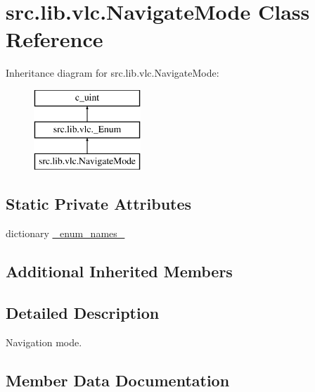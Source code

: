 \hypertarget{classsrc_1_1lib_1_1vlc_1_1NavigateMode}{}\section{src.\+lib.\+vlc.\+Navigate\+Mode Class Reference}
\label{classsrc_1_1lib_1_1vlc_1_1NavigateMode}
Inheritance diagram for src.\+lib.\+vlc.\+Navigate\+Mode\+:\begin{figure}[H]
\begin{center}
\leavevmode
\includegraphics[height=3.000000cm]{classsrc_1_1lib_1_1vlc_1_1NavigateMode}
\end{center}
\end{figure}
\subsection*{Static Private Attributes}
\begin{DoxyCompactItemize}
\item 
dictionary \hyperlink{classsrc_1_1lib_1_1vlc_1_1NavigateMode_a6bd87d39ccd020c4b4a2e31189764bc5}{\+\_\+enum\+\_\+names\+\_\+}
\end{DoxyCompactItemize}
\subsection*{Additional Inherited Members}


\subsection{Detailed Description}
\begin{DoxyVerb}Navigation mode.
\end{DoxyVerb}
 

\subsection{Member Data Documentation}
\hypertarget{classsrc_1_1lib_1_1vlc_1_1NavigateMode_a6bd87d39ccd020c4b4a2e31189764bc5}{}
